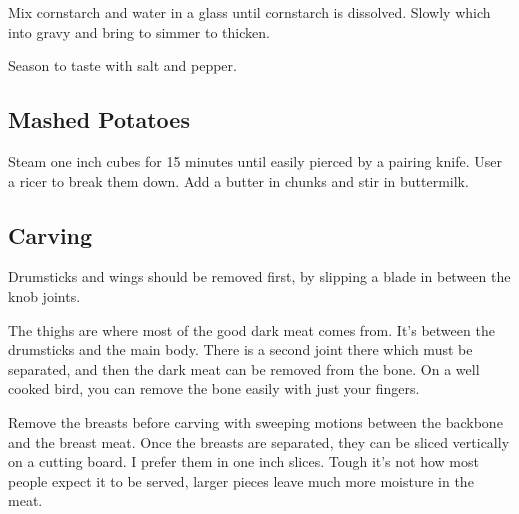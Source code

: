 \begin{recipe}
Mix cornstarch and water in a glass until cornstarch is dissolved. Slowly which into gravy and bring to simmer to thicken.

Season to taste with salt and pepper.

\subsection{Mashed Potatoes}


Steam one inch cubes for 15 minutes until easily pierced by a pairing knife. User a ricer to break them down. Add a butter in chunks and stir in buttermilk.

\subsection{Carving}

Drumsticks and wings should be removed first, by slipping a blade in between the knob joints.

The thighs are where most of the good dark meat comes from. It's between the drumsticks and the main body. There is a second joint there which must be separated, and then the dark meat can be removed from the bone. On a well cooked bird, you can remove the bone easily with just your fingers.

Remove the breasts before carving with sweeping motions between the backbone and the breast meat. Once the breasts are separated, they can be sliced vertically on a cutting board. I prefer them in one inch slices. Tough it's not how most people expect it to be served, larger pieces leave much more moisture in the meat.

\end{recipe}
